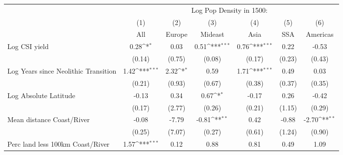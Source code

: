 {
\def\sym#1{\ifmmode^{#1}\else\(^{#1}\)\fi}
\begin{tabular}{l*{6}{c}}
\toprule
                    &\multicolumn{6}{c}{Log Pop Density in 1500:}                                                                                       \\
                    &\multicolumn{1}{c}{(1)}         &\multicolumn{1}{c}{(2)}         &\multicolumn{1}{c}{(3)}         &\multicolumn{1}{c}{(4)}         &\multicolumn{1}{c}{(5)}         &\multicolumn{1}{c}{(6)}         \\
                    &         All         &      Europe         &     Mideast         &        Asia         &         SSA         &    Americas         \\
\midrule
Log CSI yield       &        0.28\sym{*}  &        0.03         &        0.51\sym{***}&        0.76\sym{***}&        0.22         &       -0.53         \\
                    &      (0.14)         &      (0.75)         &      (0.08)         &      (0.17)         &      (0.23)         &      (0.43)         \\
\addlinespace
Log Years since Neolithic Transition&        1.42\sym{***}&        2.32\sym{*}  &        0.59         &        1.71\sym{***}&        0.49         &        0.03         \\
                    &      (0.21)         &      (0.93)         &      (0.67)         &      (0.38)         &      (0.37)         &      (0.35)         \\
\addlinespace
Log Absolute Latitude&       -0.13         &        0.34         &        0.67\sym{*}  &       -0.17         &        0.26         &       -0.42         \\
                    &      (0.17)         &      (2.77)         &      (0.26)         &      (0.21)         &      (1.15)         &      (0.29)         \\
\addlinespace
Mean distance Coast/River&       -0.08         &       -7.79         &       -0.81\sym{**} &        0.42         &       -0.88         &       -2.70\sym{**} \\
                    &      (0.25)         &      (7.07)         &      (0.27)         &      (0.61)         &      (1.24)         &      (0.90)         \\
\addlinespace
Perc land less 100km Coast/River&        1.57\sym{***}&        0.12         &        0.88         &        0.81         &        0.49         &        1.09         \\

\end{tabular}}
